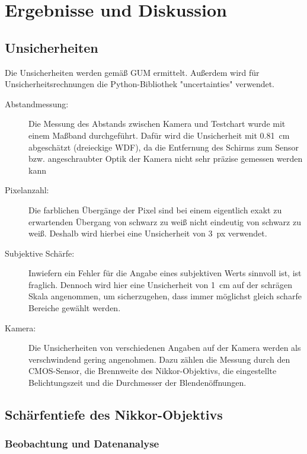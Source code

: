 \documentclass[
	a4paper,
	12pt,
	pagesize,
	ngerman
]{scrartcl}
\begin{document}
	\section{Ergebnisse und Diskussion}
	
	\subsection{Unsicherheiten} %
	Die Unsicherheiten werden gemäß GUM ermittelt. 
	Außerdem wird für Unsicherheitsrechnungen die Python-Bibliothek "uncertainties" verwendet.
	\begin{description}
		\item[Abstandmessung:] Die Messung des Abstands zwischen Kamera und Testchart wurde mit einem Maßband durchgeführt. 
			Dafür wird die Unsicherheit mit \SI{0,81}{cm} abgeschätzt (dreieckige WDF), da die Entfernung des Schirms zum Sensor bzw. angeschraubter Optik der Kamera nicht sehr präzise gemessen werden kann
		\item[Pixelanzahl:] Die farblichen Übergänge der Pixel sind bei einem eigentlich exakt zu erwartenden Übergang von schwarz zu weiß nicht eindeutig von schwarz zu weiß. %
			Deshalb wird hierbei eine Unsicherheit von \SI{3}{px} verwendet.
		\item[Subjektive Schärfe:] Inwiefern ein Fehler für die Angabe eines subjektiven Werts sinnvoll ist, ist fraglich. %
			Dennoch wird hier eine Unsicherheit von \SI{1}{cm} auf der schrägen Skala angenommen, um sicherzugehen, dass immer möglichst gleich scharfe Bereiche gewählt werden. 
		\item[Kamera:] Die Unsicherheiten von verschiedenen Angaben auf der Kamera werden als verschwindend gering angenohmen.
			Dazu zählen die Messung durch den CMOS-Sensor, die Brennweite des Nikkor-Objektivs, die eingestellte Belichtungszeit und die Durchmesser der Blendenöffnungen. %
	\end{description} 

	\subsection{Schärfentiefe des Nikkor-Objektivs}
	\subsubsection{Beobachtung und Datenanalyse}
\end{document}

